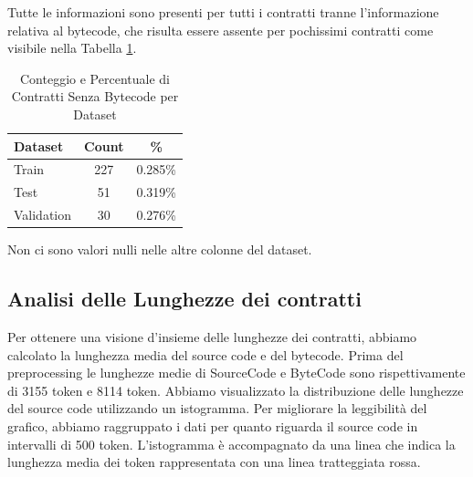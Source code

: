 \documentclass[../../Thesis.tex]{subfiles}
\begin{document}
Tutte le informazioni sono presenti per tutti i contratti tranne l'informazione relativa al bytecode, che risulta essere assente per pochissimi contratti come visibile nella Tabella \ref{tab:no_bytecode_count}. 
\begin{table}[h!]
    \centering
    \begin{tabular}{|l|c|c|}
        \hline
        \textbf{Dataset} & \textbf{Count} & \textbf{\%} \\
        \hline
        Train & 227 & 0.285\% \\
        Test & 51 & 0.319\% \\
        Validation & 30 & 0.276\% \\
        \hline
    \end{tabular}
    \caption{Conteggio e Percentuale di Contratti Senza Bytecode per Dataset}
    \label{tab:no_bytecode_count}
\end{table}
Non ci sono valori nulli nelle altre colonne del dataset.
\subsection{Analisi delle Lunghezze dei contratti}
Per ottenere una visione d'insieme delle lunghezze dei contratti, abbiamo calcolato la lunghezza media del source code e del bytecode. Prima del preprocessing le lunghezze medie di SourceCode e ByteCode sono rispettivamente di 3155 token e 8114 token.
Abbiamo visualizzato la distribuzione delle lunghezze del source code utilizzando un istogramma. Per migliorare la leggibilità del grafico, abbiamo raggruppato i dati per quanto riguarda il source code in intervalli di 500 token. L'istogramma è accompagnato da una linea che indica la lunghezza media dei token rappresentata con una linea tratteggiata rossa.
\end{document}
